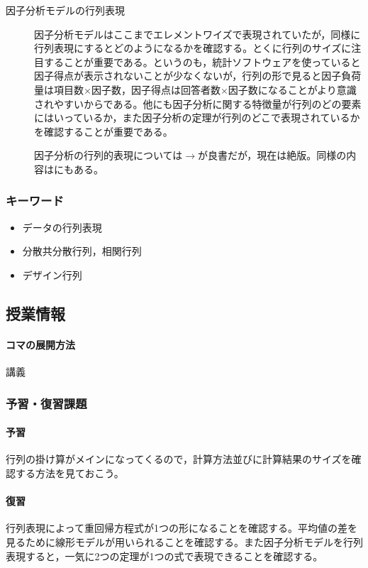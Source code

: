 \begin{description}
	\item[因子分析モデルの行列表現]因子分析モデルはここまでエレメントワイズで表現されていたが，同様に行列表現にするとどのようになるかを確認する。とくに行列のサイズに注目することが重要である。というのも，統計ソフトウェアを使っていると因子得点が表示されないことが少なくないが，行列の形で見ると因子負荷量は項目数$\times$因子数，因子得点は回答者数$\times$因子数になることがより意識されやすいからである。他にも因子分析に関する特徴量が行列のどの要素にはいっているか，また因子分析の定理が行列のどこで表現されているかを確認することが重要である。
	      \begin{flushright}
		      因子分析の行列的表現については$\to$\textcite{Shibasuke197901}が良書だが，現在は絶版。同様の内容は\textcite{kosugi2018}にもある。
	      \end{flushright}
\end{description}
\subsubsection{キーワード}
\begin{itemize}
	\item データの行列表現
	\item 分散共分散行列，相関行列
	\item デザイン行列
\end{itemize}
\subsection{授業情報}
\paragraph{コマの展開方法}
講義
\subsubsection{予習・復習課題}
\paragraph{予習}行列の掛け算がメインになってくるので，計算方法並びに計算結果のサイズを確認する方法を見ておこう。
\paragraph{復習}行列表現によって重回帰方程式が1つの形になることを確認する。平均値の差を見るために線形モデルが用いられることを確認する。また因子分析モデルを行列表現すると，一気に2つの定理が1つの式で表現できることを確認する。
